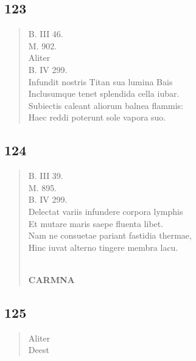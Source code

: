 \documentclass[11pt, a4paper]{report}
\begin{document}
            \subsection*{123}
      \begin{verse}
      B. III 46. \\ M. 902. \\ Aliter \\ B. IV 299. \\ Infundit nostris Titan sua lumina Bais \\ Inclusumque tenet splendida cella iubar. \\ Subiectis caleant aliorum balnea flammis: \\ Haec reddi poterunt sole vapora suo. \\ 
      \end{verse}
  
            \subsection*{124}
      \begin{verse}
      B. III 39. \\ M. 895. \\ B. IV 299. \\ Delectat variis infundere corpora lymphis \\ Et mutare maris saepe fluenta libet. \\ Nam ne consuetae pariant fastidia thermae, \\ Hinc iuvat alterno tingere membra lacu. \\ 
        ﻿\pagebreak 
     \marginpar{[136]} \begin{center} \textbf{CARMNA} \end{center}
      \end{verse}
  
            \subsection*{125}
      \begin{verse}
      Aliter \\ Deest \\ 
      \end{verse}
  
\end{document}
